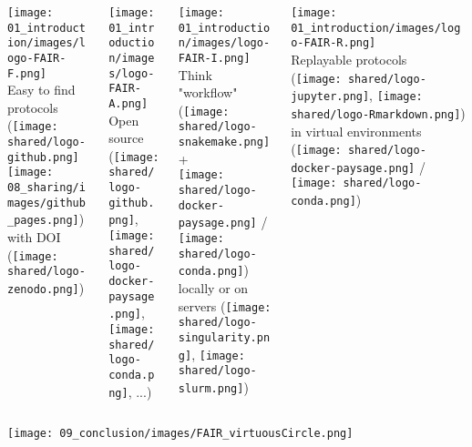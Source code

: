 \begin{frame}{\FAIRB}
\begin{columns}[t]
  \begin{column}{.25\textwidth}
      \begin{center}
      \texttt{[image: 01\_introduction/images/logo-FAIR-F.png]}\\Easy to find protocols\\(\texttt{[image: shared/logo-github.png]} \texttt{[image: 08\_sharing/images/github\_pages.png]})\\with DOI (\texttt{[image: shared/logo-zenodo.png]})
      \end{center}
  \end{column}
  \begin{column}{.25\textwidth}
      \begin{center}
      \texttt{[image: 01\_introduction/images/logo-FAIR-A.png]}\\Open source (\texttt{[image: shared/logo-github.png]},\\ \texttt{[image: shared/logo-docker-paysage.png]},\\ \texttt{[image: shared/logo-conda.png]}, ...)
      \end{center}
  \end{column}
  \begin{column}{.25\textwidth}
     \begin{center}
     \texttt{[image: 01\_introduction/images/logo-FAIR-I.png]}\\Think "workflow" (\texttt{[image: shared/logo-snakemake.png]} +\\ \texttt{[image: shared/logo-docker-paysage.png]} / \texttt{[image: shared/logo-conda.png]})\\locally or on servers (\texttt{[image: shared/logo-singularity.png]}, \texttt{[image: shared/logo-slurm.png]})
     \end{center}
  \end{column}
  \begin{column}{.25\textwidth}
     \begin{center}
     \texttt{[image: 01\_introduction/images/logo-FAIR-R.png]}\\Replayable protocols\\(\texttt{[image: shared/logo-jupyter.png]}, \texttt{[image: shared/logo-Rmarkdown.png]}) in virtual environments (\texttt{[image: shared/logo-docker-paysage.png]} / \texttt{[image: shared/logo-conda.png]})
     \end{center}
  \end{column}
\end{columns}
\begin{center}
    \texttt{[image: 09\_conclusion/images/FAIR\_virtuousCircle.png]}
\end{center}
\end{frame}

